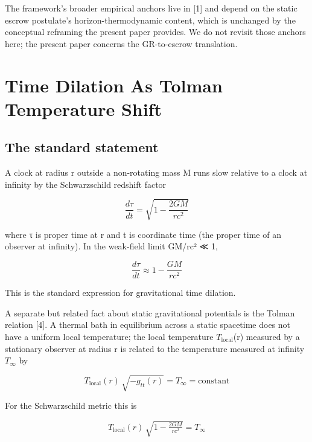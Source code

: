 \documentclass[11pt]{article}
\begin{document}
The framework's broader empirical anchors live in [1] and depend on
the static escrow postulate's horizon-thermodynamic content, which is
unchanged by the conceptual reframing the present paper provides. We do
not revisit those anchors here; the present paper concerns the
GR-to-escrow translation.


\section{Time Dilation As Tolman Temperature Shift}


\subsection{The standard statement}

A clock at radius r outside a non-rotating mass M runs slow relative to
a clock at infinity by the Schwarzschild redshift factor

\begin{equation}
  \frac{d\tau}{dt} = \sqrt{1 - \frac{2GM}{rc^{2}}}
  \label{eq:1}
\end{equation}

where τ is proper time at r and t is coordinate time (the proper time of
an observer at infinity). In the weak-field limit GM/rc² ≪ 1,

\begin{equation}
  \frac{d\tau}{dt} \approx 1 - \frac{GM}{rc^{2}}
  \label{eq:2}
\end{equation}

This is the standard expression for gravitational time dilation.

A separate but related fact about static gravitational potentials is the
Tolman relation [4]. A thermal bath in equilibrium across a static
spacetime does not have a uniform local temperature; the local
temperature $T_{\mathrm{local}}$(r) measured by a stationary observer at radius r is
related to the temperature measured at infinity $T_{\infty}$ by

\begin{equation}
  T_{\mathrm{local}}(r)\,\sqrt{-g_{tt}(r)} = T_{\infty} = \text{constant}
  \label{eq:3}
\end{equation}

For the Schwarzschild metric this is

\begin{equation}
  T_{\mathrm{local}}(r)\,\sqrt{1 - \tfrac{2GM}{rc^{2}}} = T_{\infty}
  \label{eq:4}
\end{equation}
\end{document}
